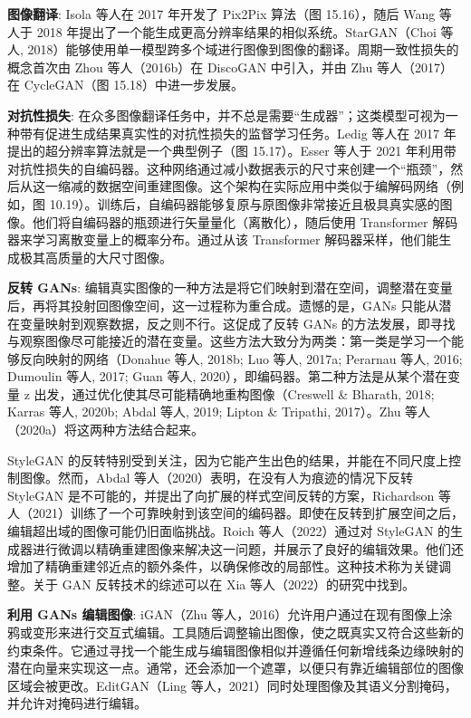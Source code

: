 \textbf{图像翻译}: Isola 等人在 2017 年开发了 Pix2Pix 算法（图 15.16），随后 Wang 等人于 2018 年提出了一个能生成更高分辨率结果的相似系统。StarGAN（Choi 等人, 2018）能够使用单一模型跨多个域进行图像到图像的翻译。周期一致性损失的概念首次由 Zhou 等人（2016b）在 DiscoGAN 中引入，并由 Zhu 等人（2017）在 CycleGAN（图 15.18）中进一步发展。

\textbf{对抗性损失}: 在众多图像翻译任务中，并不总是需要“生成器”；这类模型可视为一种带有促进生成结果真实性的对抗性损失的监督学习任务。Ledig 等人在 2017 年提出的超分辨率算法就是一个典型例子（图 15.17）。Esser 等人于 2021 年利用带对抗性损失的自编码器。这种网络通过减小数据表示的尺寸来创建一个“瓶颈”，然后从这一缩减的数据空间重建图像。这个架构在实际应用中类似于编解码网络（例如，图 10.19）。训练后，自编码器能够复原与原图像非常接近且极具真实感的图像。他们将自编码器的瓶颈进行矢量量化（离散化），随后使用 Transformer 解码器来学习离散变量上的概率分布。通过从该 Transformer 解码器采样，他们能生成极其高质量的大尺寸图像。

\textbf{反转 GANs}: 编辑真实图像的一种方法是将它们映射到潜在空间，调整潜在变量后，再将其投射回图像空间，这一过程称为重合成。遗憾的是，GANs 只能从潜在变量映射到观察数据，反之则不行。这促成了反转 GANs 的方法发展，即寻找与观察图像尽可能接近的潜在变量。这些方法大致分为两类：第一类是学习一个能够反向映射的网络（Donahue 等人, 2018b; Luo 等人, 2017a; Perarnau 等人, 2016; Dumoulin 等人, 2017; Guan 等人, 2020），即编码器。第二种方法是从某个潜在变量 z 出发，通过优化使其尽可能精确地重构图像（Creswell \& Bharath, 2018; Karras 等人, 2020b; Abdal 等人, 2019; Lipton \& Tripathi, 2017）。Zhu 等人（2020a）将这两种方法结合起来。

StyleGAN 的反转特别受到关注，因为它能产生出色的结果，并能在不同尺度上控制图像。然而，Abdal 等人（2020）表明，在没有人为痕迹的情况下反转 StyleGAN 是不可能的，并提出了向扩展的样式空间反转的方案，Richardson 等人（2021）训练了一个可靠映射到该空间的编码器。即使在反转到扩展空间之后，编辑超出域的图像可能仍旧面临挑战。Roich 等人（2022）通过对 StyleGAN 的生成器进行微调以精确重建图像来解决这一问题，并展示了良好的编辑效果。他们还增加了精确重建邻近点的额外条件，以确保修改的局部性。这种技术称为关键调整。关于 GAN 反转技术的综述可以在 Xia 等人（2022）的研究中找到。

\textbf{利用 GANs 编辑图像}: iGAN（Zhu 等人，2016）允许用户通过在现有图像上涂鸦或变形来进行交互式编辑。工具随后调整输出图像，使之既真实又符合这些新的约束条件。它通过寻找一个能生成与编辑图像相似并遵循任何新增线条边缘映射的潜在向量来实现这一点。通常，还会添加一个遮罩，以便只有靠近编辑部位的图像区域会被更改。EditGAN（Ling 等人，2021）同时处理图像及其语义分割掩码，并允许对掩码进行编辑。

